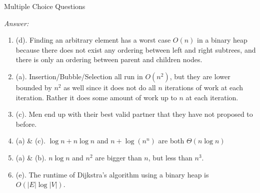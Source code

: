 \documentclass[12pt]{article}
\newenvironment{problem}[2][Problem]{\begin{trivlist}
\item[\hskip \labelsep {\bfseries #1}\hskip \labelsep {\bfseries #2.}]}{\end{trivlist}}
\begin{document}
\begin{problem}{2} 
    Multiple Choice Questions
\end{problem}
\textit{Answer:}
\begin{enumerate}
    \item (d). Finding an arbitrary element has a worst case $O(n)$ in a binary heap because there does not exist any ordering between left and right subtrees, and there is only an ordering between parent and children nodes.
    \item (a). Insertion/Bubble/Selection all run in $O(n^2)$, but they are lower bounded by $n^2$ as well since it does not do all $n$ iterations of work at each iteration. Rather it does some amount of work up to $n$ at each iteration.
    \item (c). Men end up with their best valid partner that they have not proposed to before.
    \item (a) \& (c). $\log n+n\log n$ and $n+\log(n^n)$ are both $\Theta(n\log n)$
    \item (a) \& (b). $n\log n$ and $n^2$ are bigger than $n$, but less than $n^3$.
    \item (e). The runtime of Dijkstra's algorithm using a binary heap is 
    $O(|E|\log|V|)$.
\end{enumerate}
\end{document}

